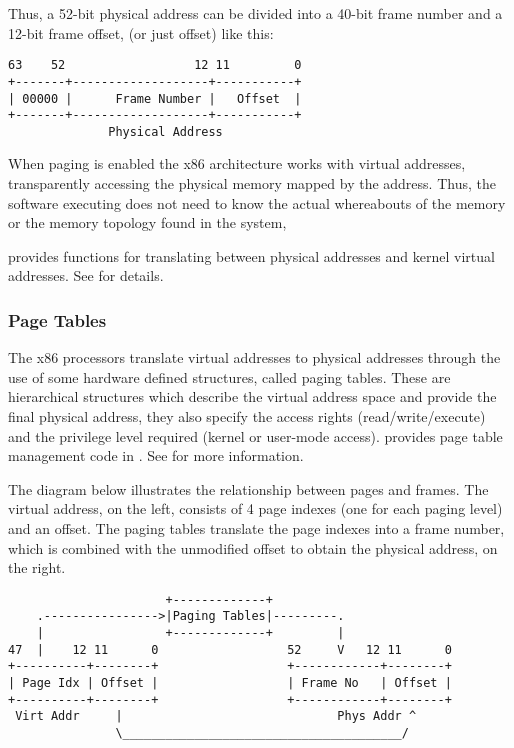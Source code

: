 Thus, a 52-bit physical address can be divided into a 40-bit frame number and a 12-bit frame offset,
(or just offset) like this:

\begin{verbatim}
63    52                  12 11         0
+-------+-------------------+-----------+
| 00000 |      Frame Number |   Offset  |
+-------+-------------------+-----------+
              Physical Address
\end{verbatim}

When paging is enabled the x86 architecture works with virtual addresses, transparently accessing
the physical memory mapped by the address. Thus, the software executing does not need to know the
actual whereabouts of the memory or the memory topology found in the system,

\projectname provides functions for translating between physical addresses and kernel virtual
addresses. See  for details.

\subsubsection{Page Tables}

The x86 processors translate virtual addresses to physical addresses through the use of some hardware
defined structures, called paging tables. These are hierarchical structures which describe the
virtual address space and provide the final physical address, they also specify the access rights
(read/write/execute) and the privilege level required (kernel or user-mode access). \projectname
provides page table management code in . See  for more
information.

The diagram below illustrates the relationship between pages and frames. The virtual address, on the
left, consists of 4 page indexes (one for each paging level) and an offset. The paging tables
translate the page indexes into a frame number, which is combined with the unmodified offset to 
obtain the physical address, on the right.

\begin{verbatim}
                      +-------------+
    .---------------->|Paging Tables|---------.
    |                 +-------------+         |
47  |    12 11      0                  52     V   12 11      0
+----------+--------+                  +------------+--------+
| Page Idx | Offset |                  | Frame No   | Offset |
+----------+--------+                  +------------+--------+
 Virt Addr     |                              Phys Addr ^
               \_______________________________________/
\end{verbatim}

